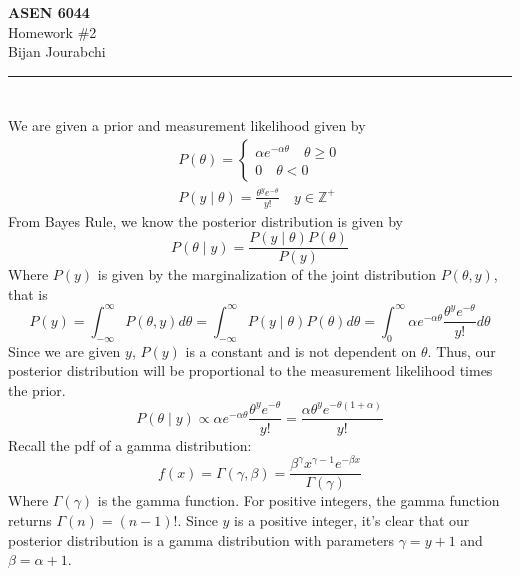 \documentclass[11pt]{article}
\newcommand{\course}{ASEN 6044}
\newcommand{\assignment}{Homework \#2}
\newcommand{\studentname}{Bijan Jourabchi}
\begin{document}
\begin{center}
    {\LARGE \textbf{\course}} \\[6pt]
    {\Large \assignment} \\[10pt]
    \studentname \\
\end{center}

\vspace{1em}
\hrule
\vspace{1em}


\section{}

We are given a prior and measurement likelihood given by
\begin{align*}
    P(\theta) = \begin{cases}
        \alpha e^{-\alpha\theta} \quad \theta \geq 0 \\
        0 \quad \theta < 0
    \end{cases} \\
    P(y \mid \theta) = \frac{\theta^y e^{-\theta}}{y!} \quad y \in \mathbb{Z^+}
\end{align*}
From Bayes Rule, we know the posterior distribution is given by
\[
P(\theta \mid y) = \frac{P(y \mid \theta)P(\theta)}{P(y)}
\]
Where $P(y)$ is given by the marginalization of the joint distribution $P(\theta,y)$, that is
\[P(y) = \int_{-\infty}^\infty P(\theta, y) d\theta = \int_{-\infty}^\infty P(y \mid \theta)P(\theta) d\theta
= \int_{0}^\infty \alpha e^{-\alpha\theta} \frac{\theta^y e^{-\theta}}{y!} d\theta \]
Since we are given $y$, $P(y)$ is a constant and is not dependent on $\theta$. Thus, our posterior distribution will be 
proportional to the measurement likelihood times the prior.
\[
 P(\theta \mid y) \propto \alpha e^{-\alpha\theta} \frac{\theta^y e^{-\theta}}{y!} = \frac{\alpha \theta^y e^{-\theta(1+\alpha)}}{y!}
\] 
Recall the pdf of a gamma distribution:
\[
f(x) = \Gamma(\gamma,\beta) = \frac{\beta^{\gamma}x^{\gamma-1}e^{-\beta x}}{\Gamma(\gamma)}
\]
Where $\Gamma(\gamma)$ is the gamma function. For positive integers, the gamma function returns $\Gamma(n) = (n-1)!$. Since $y$ is a positive integer, it's clear that our posterior distribution is a gamma distribution with parameters $\gamma = y+1$ and $\beta = \alpha+1$.
\end{document}
